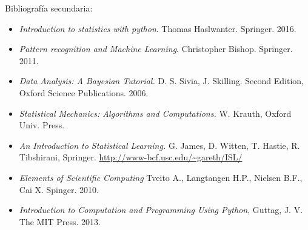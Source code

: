 \documentclass[letterpaper,10pt,onecolumn]{article}
\begin{document}
\noindent\normalsize Bibliograf\'ia secundaria:
\begin{itemize}
\item
\textit{Introduction to statistics with python}.
Thomas Haslwanter.  Springer. 2016.

\item 
\textit{Pattern recognition and Machine Learning}.
Christopher Bishop. Springer. 2011.

\item
\textit{Data Analysis: A Bayesian Tutorial.} D. S. Sivia,
J. Skilling. Second Edition, Oxford Science Publications. 2006.

\item 
\textit{Statistical Mechanics: Algorithms and Computations.}
W. Krauth, Oxford Univ. Press. 

\item
\textit{An Introduction to Statistical Learning.} G. James, D. Witten,
T. Hastie, R. Tibshirani,
Springer. \url{http://www-bcf.usc.edu/~gareth/ISL/} 


\item
\textit{Elements of Scientific Computing}
Tveito A., Langtangen H.P., Nielsen B.F., Cai X. Spinger. 2010.

\item 
\textit{Introduction to Computation and Programming Using Python},
Guttag, J. V. The MIT Press. 2013.

\end{itemize}
\end{document}
